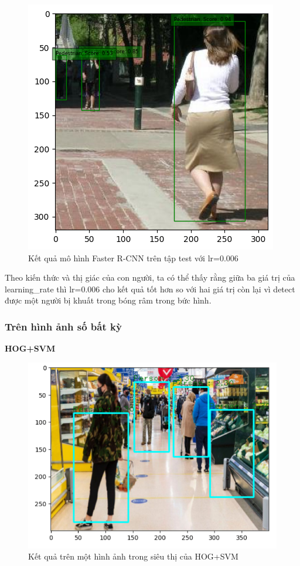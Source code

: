 \pagebreak

\begin{figure}[h!]
  \centering
  \includegraphics[scale=0.7]{graphics/test_0006.png}
  \caption{Kết quả mô hình Faster R-CNN trên tập test với lr=0.006}
\end{figure}

Theo kiến thức và thị giác của con người, ta có thể thấy rằng giữa ba giá trị của learning\_rate thì lr=0.006 cho kết quả tốt hơn so với hai giá trị còn lại vì detect được một người bị khuất trong bóng râm trong bức hình.\\

\subsubsection{Trên hình ảnh số bất kỳ}
\textbf{HOG+SVM}

\begin{figure}[h!]
  \centering
  \includegraphics[scale=0.55]{graphics/rshogsvm0.png}
  \caption{Kết quả trên một hình ảnh trong siêu thị của HOG+SVM}
\end{figure}

